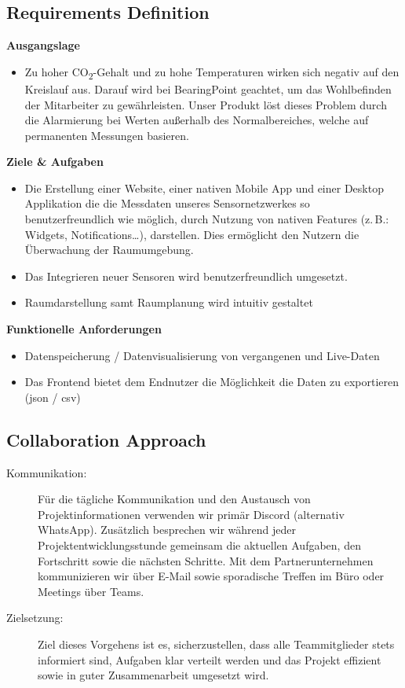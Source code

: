 \documentclass{article}
\begin{document}
\subsection{Requirements Definition}

\noindent\textbf{Ausgangslage}
\begin{itemize}
  \item Zu hoher CO\textsubscript{2}-Gehalt und zu hohe Temperaturen wirken sich negativ auf den Kreislauf aus. Darauf wird bei BearingPoint geachtet, um das Wohlbefinden der Mitarbeiter zu gewährleisten. Unser Produkt löst dieses Problem durch die Alarmierung bei Werten außerhalb des Normalbereiches, welche auf permanenten Messungen basieren.
\end{itemize}

\noindent\textbf{Ziele \& Aufgaben}
\begin{itemize}
  \item Die Erstellung einer Website, einer nativen Mobile App und einer Desktop Applikation die die Messdaten unseres Sensornetzwerkes so benutzerfreundlich wie möglich, durch Nutzung von nativen Features (z.\,B.: Widgets, Notifications…), darstellen. Dies ermöglicht den Nutzern die Überwachung der Raumumgebung.
  \item Das Integrieren neuer Sensoren wird benutzerfreundlich umgesetzt.
  \item Raumdarstellung samt Raumplanung wird intuitiv gestaltet
\end{itemize}

\noindent\textbf{Funktionelle Anforderungen}
\begin{itemize}
  \item Datenspeicherung / Datenvisualisierung von vergangenen und Live-Daten
  \item Das Frontend bietet dem Endnutzer die Möglichkeit die Daten zu exportieren (json / csv)
\end{itemize}


\subsection{Collaboration Approach}
\begin{description}
  \item[Kommunikation:] Für die tägliche Kommunikation und den Austausch von Projektinformationen verwenden wir primär Discord (alternativ WhatsApp). Zusätzlich besprechen wir während jeder Projektentwicklungsstunde gemeinsam die aktuellen Aufgaben, den Fortschritt sowie die nächsten Schritte. Mit dem Partnerunternehmen kommunizieren wir über E-Mail sowie sporadische Treffen im Büro oder Meetings über Teams.

  \item[Zielsetzung:] Ziel dieses Vorgehens ist es, sicherzustellen, dass alle Teammitglieder stets informiert sind, Aufgaben klar verteilt werden und das Projekt effizient sowie in guter Zusammenarbeit umgesetzt wird.
\end{description}
\end{document}
